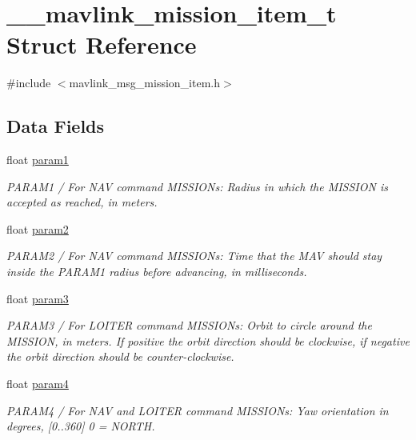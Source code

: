 \hypertarget{struct____mavlink__mission__item__t}{\section{\-\_\-\-\_\-mavlink\-\_\-mission\-\_\-item\-\_\-t Struct Reference}
\label{struct____mavlink__mission__item__t}
}


{\ttfamily \#include $<$mavlink\-\_\-msg\-\_\-mission\-\_\-item.\-h$>$}

\subsection*{Data Fields}
\begin{DoxyCompactItemize}
\item 
float \hyperlink{struct____mavlink__mission__item__t_a7b622b789be829088a8c9353946a4f28}{param1}
\begin{DoxyCompactList}\small\item\em P\-A\-R\-A\-M1 / For N\-A\-V command M\-I\-S\-S\-I\-O\-Ns\-: Radius in which the M\-I\-S\-S\-I\-O\-N is accepted as reached, in meters. \end{DoxyCompactList}\item 
float \hyperlink{struct____mavlink__mission__item__t_ad523243067b6c47919554e8802f14b5c}{param2}
\begin{DoxyCompactList}\small\item\em P\-A\-R\-A\-M2 / For N\-A\-V command M\-I\-S\-S\-I\-O\-Ns\-: Time that the M\-A\-V should stay inside the P\-A\-R\-A\-M1 radius before advancing, in milliseconds. \end{DoxyCompactList}\item 
float \hyperlink{struct____mavlink__mission__item__t_a183425d5376a9173373279cc43ffce25}{param3}
\begin{DoxyCompactList}\small\item\em P\-A\-R\-A\-M3 / For L\-O\-I\-T\-E\-R command M\-I\-S\-S\-I\-O\-Ns\-: Orbit to circle around the M\-I\-S\-S\-I\-O\-N, in meters. If positive the orbit direction should be clockwise, if negative the orbit direction should be counter-\/clockwise. \end{DoxyCompactList}\item 
float \hyperlink{struct____mavlink__mission__item__t_a8db8965269e5523972f4645f9b52d86d}{param4}
\begin{DoxyCompactList}\small\item\em P\-A\-R\-A\-M4 / For N\-A\-V and L\-O\-I\-T\-E\-R command M\-I\-S\-S\-I\-O\-Ns\-: Yaw orientation in degrees, \mbox{[}0..360\mbox{]} 0 = N\-O\-R\-T\-H. \end{DoxyCompactList}\item 

\end{DoxyCompactItemize}
